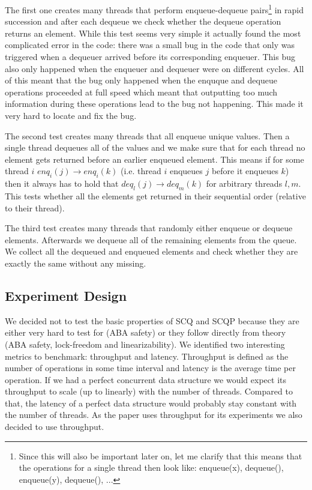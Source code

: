\documentclass{article}      %
\begin{document}
The first one creates many threads that perform enqueue-dequeue pairs\footnote{Since this will also be important later on, let me clarify that this means that the operations for a single thread then look like: enqueue(x), dequeue(), enqueue(y), dequeue(), ...} in rapid succession and after each dequeue we check whether the dequeue operation returns an element. While this test seems very simple it actually found the most complicated error in the code: there was a small bug in the code that only was triggered when a dequeuer arrived before its corresponding enqueuer. This bug also only happened when the enqueuer and dequeuer were on different cycles. All of this meant that the bug only happened when the enquque and dequeue operations proceeded at full speed which meant that outputting too much information during these operations lead to the bug not happening. This made it very hard to locate and fix the bug.

The second test creates many threads that all enqueue unique values. Then a single thread dequeues all of the values and we make sure that for each thread no element gets returned before an earlier enqueued element. This means if for some thread $i$ $enq_i (j) \rightarrow enq_i (k)$ (i.e. thread $i$ enqueues $j$ before it enqueues $k$) then it always has to hold that $deq_l(j) \rightarrow deq_m(k)$ for arbitrary threads $l, m$. This tests whether all the elements get returned in their sequential order (relative to their thread). 

The third test creates many threads that randomly either enqueue or dequeue elements. Afterwards we dequeue all of the remaining elements from the queue. We collect all the dequeued and enqueued elements and check whether they are exactly the same without any missing. 

\subsection{Experiment Design}
We decided not to test the basic properties of SCQ and SCQP because they are either very hard to test for (ABA safety) or they follow directly from theory (ABA safety, lock-freedom and linearizability). We identified two interesting metrics to benchmark: throughput and latency. Throughput is defined as the number of operations in some time interval and latency is the average time per operation. If we had a perfect concurrent data structure we would expect its throughput to scale (up to linearly) with the number of threads. Compared to that, the latency of a perfect data structure would probably stay constant with the number of threads. As the paper uses throughput for its experiments we also decided to use throughput. 
\end{document}
